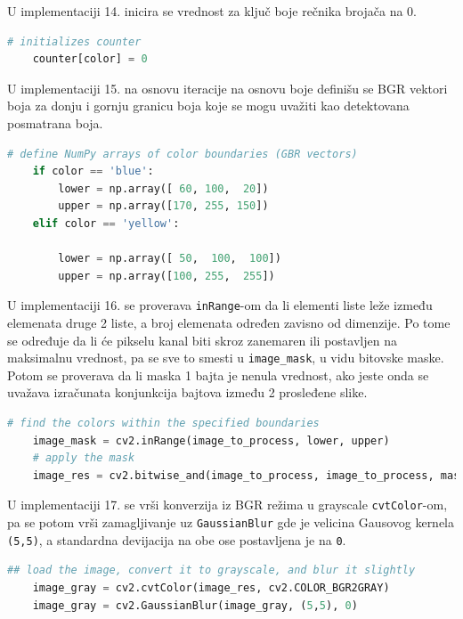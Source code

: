 \documentclass[fontsize=12bp, paper=a4]{scrarticle}
\begin{document}
U implementaciji 14. inicira se vrednost za ključ boje rečnika brojača na 0.

\begin{lstlisting}[language=Python, caption={Iniciranje odgovarajućeg ključa brojača}]
    # initializes counter
    counter[color] = 0
\end{lstlisting}
 
U implementaciji 15. na osnovu iteracije na osnovu boje definišu se BGR vektori boja za donju i gornju granicu boja koje se mogu uvažiti kao detektovana posmatrana boja.

\begin{lstlisting}[language=Python, caption={Nameštanje granica na osnovu boja}]
    # define NumPy arrays of color boundaries (GBR vectors)
    if color == 'blue':
        lower = np.array([ 60, 100,  20])
        upper = np.array([170, 255, 150])
    elif color == 'yellow':
        
        lower = np.array([ 50,  100,  100])
        upper = np.array([100, 255,  255])
\end{lstlisting}

U implementaciji 16. se proverava \verb|inRange|-om da li elementi liste leže između elemenata druge 2 liste, a broj elemenata određen zavisno od dimenzije. Po tome se određuje da li će pikselu kanal biti skroz zanemaren ili postavljen na maksimalnu vrednost, pa se sve to smesti u \verb|image_mask|, u vidu bitovske maske.\cite{inRange} Potom se proverava da li maska 1 bajta je nenula vrednost, ako jeste onda se uvažava izračunata konjunkcija bajtova između 2 prosleđene slike.\cite{konjunkcija}

\begin{lstlisting}[language=Python, caption={Bitovsko maskiranje i konjunkcije obavljene nad slikom}]
    # find the colors within the specified boundaries
    image_mask = cv2.inRange(image_to_process, lower, upper)
    # apply the mask
    image_res = cv2.bitwise_and(image_to_process, image_to_process, mask = image_mask)
\end{lstlisting} 

U implementaciji 17. se vrši konverzija iz BGR režima u grayscale \verb|cvtColor|-om, pa se potom vrši zamagljivanje uz \verb|GaussianBlur| gde je velicina Gausovog kernela \verb|(5,5)|, a standardna devijacija na obe ose postavljena je na \texttt{0}.

\begin{lstlisting}[language=Python, caption={Prosivljivanje i zamagljivanje slike}]
    ## load the image, convert it to grayscale, and blur it slightly
    image_gray = cv2.cvtColor(image_res, cv2.COLOR_BGR2GRAY)
    image_gray = cv2.GaussianBlur(image_gray, (5,5), 0)
\end{lstlisting} 
\end{document}
